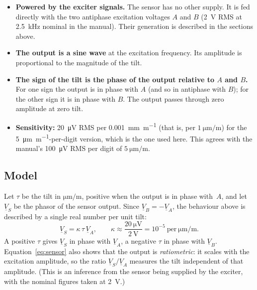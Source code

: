 \documentclass[11pt,a4paper]{article}
\begin{document}
\begin{itemize}
  \item \textbf{Powered by the exciter signals.}  The sensor has no other
        supply.  It is fed directly with the two antiphase excitation
        voltages $A$ and $B$ (\SI{2}{\volt} RMS at \SI{2.5}{\kilo\hertz}
        nominal in the manual).  Their generation is described in the
        sections above.
  \item \textbf{The output is a sine wave} at the excitation frequency.  Its
        amplitude is proportional to the magnitude of the tilt.
  \item \textbf{The sign of the tilt is the phase of the output relative to
        $A$ and $B$.}  For one sign the output is in phase with $A$ (and so
        in antiphase with $B$); for the other sign it is in phase with $B$.
        The output passes through zero amplitude at zero tilt.
  \item \textbf{Sensitivity:} \SI{20}{\micro\volt} RMS per
        \SI{0.001}{\milli\metre\per\metre} (that is, per
        $\SI{1}{\micro\metre\per\metre}$) for the
        \SI{5}{\micro\metre\per\metre}-per-digit version, which is the one
        used here.  This agrees with the manual's \SI{100}{\micro\volt} RMS
        per digit of $\SI{5}{\micro\metre\per\metre}$.
\end{itemize}

\subsection{Model}

Let $\tau$ be the tilt in $\si{\micro\metre\per\metre}$, positive when the
output is in phase with~$A$, and let $\underline{V}_S$ be the phasor of the
sensor output.  Since $\underline{V}_B=-\underline{V}_A$, the behaviour above
is described by a single real number per unit tilt:
\begin{equation}
  \underline{V}_S = \kappa\,\tau\,\underline{V}_A,
  \qquad \kappa \approx \frac{\SI{20}{\micro\volt}}{\SI{2}{\volt}}
  = 10^{-5}\ \text{per}\ \si{\micro\metre\per\metre}.
  \label{eq:sensor}
\end{equation}
A positive $\tau$ gives $\underline{V}_S$ in phase with $\underline{V}_A$, a
negative $\tau$ in phase with $\underline{V}_B$.  Equation~\eqref{eq:sensor}
also shows that the output is \emph{ratiometric}: it scales with the
excitation amplitude, so the ratio $\underline{V}_S/\underline{V}_A$ measures
the tilt independent of that amplitude.  (This is an inference from the
sensor being supplied by the exciter, with the nominal figures taken at
\SI{2}{\volt}.)
\end{document}
